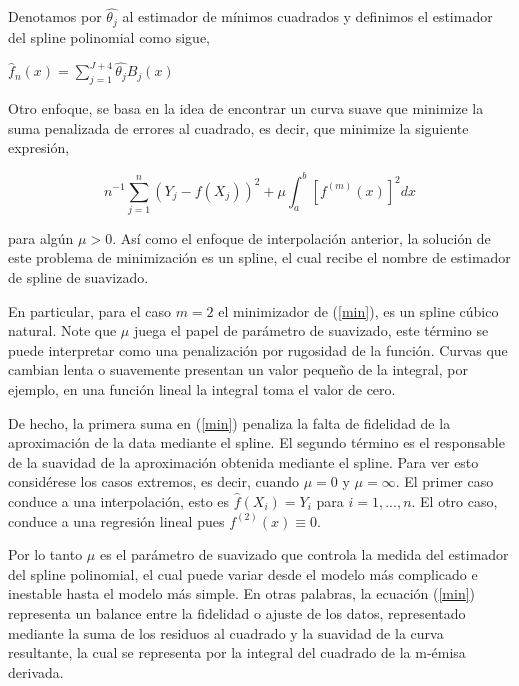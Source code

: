 \vspace{0.2cm}

\hspace{0.4cm}Denotamos por $\hat{\theta_{j}}$ al estimador de m\'inimos cuadrados y definimos el estimador del spline polinomial como sigue,

\vspace{0.2cm}


\begin{center}
$\displaystyle{ \hat{f}_{n}(x) = \sum_{j=1}^{J+4} \hat{\theta_{j}}B_{j}(x)}$
\end{center}

\vspace{0.2cm}


\hspace{0.5cm} Otro enfoque, se basa en la idea de encontrar un curva suave que minimize la suma penalizada de errores al cuadrado, es decir, que minimize la siguiente expresi\'on,

\begin{equation}\label{min}
  n^{-1}\sum_{j=1}^{n}(Y_{j}-f(X_{j}))^2+\mu \int_{a}^{b} [f^{(m)} (x)]^2 dx
\end{equation}

\vspace{0.2cm}

\noindent para alg\'un $\mu > 0$. As\'i como el enfoque de interpolaci\'on anterior, la soluci\'on de este problema de minimizaci\'on es un spline, el cual recibe el nombre de estimador de spline de suavizado.


\hspace{0.4cm} En particular, para el caso $m=2$ el minimizador de (\ref{min}), es un spline c\'ubico natural. Note que $\mu$ juega el papel de par\'ametro de suavizado, este t\'ermino se puede interpretar como una penalizaci\'on por rugosidad de la funci\'on. Curvas que cambian lenta o suavemente presentan un valor peque\~no de la integral, por ejemplo, en una funci\'on lineal la integral toma el valor de cero.


\hspace{0.4cm} De hecho, la primera suma en (\ref{min}) penaliza la falta de fidelidad de la aproximaci\'on de la data mediante el spline. El segundo t\'ermino es el responsable de la suavidad de la aproximaci\'on obtenida mediante el spline. Para ver esto consid\'erese los casos extremos, es decir, cuando $\mu =0$ y $\mu=\infty$. El primer caso conduce a una interpolaci\'on, esto es $\hat{f}(X_{i})=Y_{i}$ para $i=1,...,n$. El otro caso, conduce a una regresi\'on lineal pues $f^{(2)}(x)\equiv 0$.


\hspace{0.4cm} Por lo tanto $\mu$ es el par\'ametro de suavizado que controla la medida del estimador del spline polinomial, el cual puede variar desde el modelo m\'as complicado e inestable hasta el modelo m\'as simple. En otras palabras, la ecuaci\'on (\ref{min}) representa un balance entre la fidelidad o ajuste de los datos, representado mediante la suma de los residuos al cuadrado y la suavidad de la curva resultante, la cual se representa por la integral del cuadrado de la m-\'emisa derivada.


